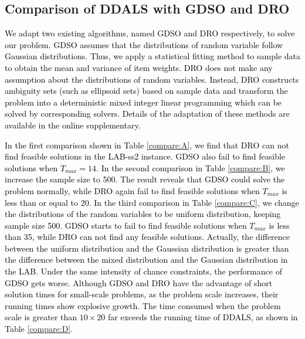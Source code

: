 \documentclass[lettersize,journal]{IEEEtran}
\begin{document}
\subsection{Comparison of DDALS with GDSO and DRO}
\label{sec:compare_SO_DRO}

\textcolor{black}{
We adapt two existing algorithms, named GDSO \cite{yang2018algorithm} and DRO \cite{ji2021data} respectively, to solve our problem.
GDSO assumes that the distributions of random variable follow Gaussian distributions. 
Thus, we apply a statistical fitting method to sample data to obtain the mean and variance of item weights.
DRO does not make any assumption about the distributions of random variables. 
Instead, DRO constructs ambiguity sets (such as ellipsoid sets) based on sample data and transform the problem into a deterministic mixed integer linear programming which can be solved by corresponding solvers.
Details of the adaptation of these methods are available in the online supplementary.
}

\textcolor{black}{
In the first comparison shown in Table \ref{compare:A}, we find that DRO can not find feasible solutions in the LAB-ss2 instance. 
GDSO also fail to find feasible solutions when $T_{max}=14$.
In the second comparison in Table \ref{compare:B}, we increase the sample size to 500. 
The result reveals that GDSO could solve the problem normally, while DRO again fail to find feasible solutions when $T_{max}$ is less than or equal to 20.
In the third comparison in Table \ref{compare:C}, we change the distributions of the random variables to be uniform distribution, keeping sample size 500. 
GDSO starts to fail to find feasible solutions when $T_{max}$ is less than 35, while DRO can not find any feasible solutions.
Actually, the difference between the uniform distribution and the Gaussian distribution is greater than the difference between the mixed distribution and the Gaussian distribution in the LAB. 
Under the same intensity of chance constraints, the performance of GDSO gets worse.
Although GDSO and DRO have the advantage of short solution times for small-scale problems, as the problem scale increases, their running times show explosive growth. 
The time consumed when the problem scale is greater than $10\times 20$ far exceeds the running time of DDALS, as shown in Table \ref{compare:D}.}

\end{document}
